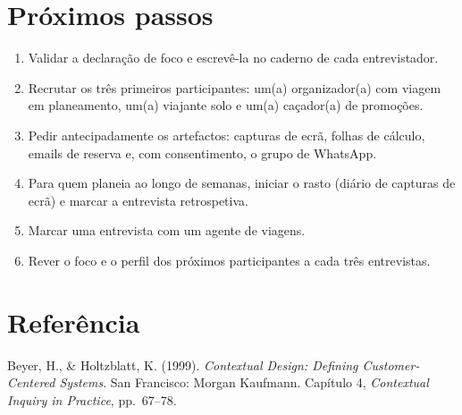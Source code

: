 \documentclass[11pt,a4paper]{article}
\begin{document}
\section{Próximos passos}

\begin{enumerate}[nosep]
  \item Validar a declaração de foco e escrevê-la no caderno de cada entrevistador.
  \item Recrutar os três primeiros participantes: um(a) organizador(a) com viagem em planeamento, um(a) viajante solo e um(a) caçador(a) de promoções.
  \item Pedir antecipadamente os artefactos: capturas de ecrã, folhas de cálculo, emails de reserva e, com consentimento, o grupo de WhatsApp.
  \item Para quem planeia ao longo de semanas, iniciar o rasto (diário de capturas de ecrã) e marcar a entrevista retrospetiva.
  \item Marcar uma entrevista com um agente de viagens.
  \item Rever o foco e o perfil dos próximos participantes a cada três entrevistas.
\end{enumerate}

\section*{Referência}
Beyer, H., \& Holtzblatt, K. (1999). \textit{Contextual Design: Defining Customer-Centered Systems}. San Francisco: Morgan Kaufmann. Capítulo 4, \textit{Contextual Inquiry in Practice}, pp.~67--78.
\end{document}
